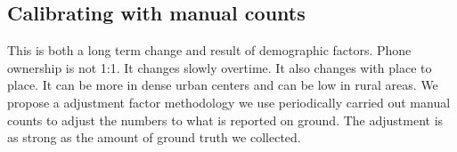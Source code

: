 \subsection{Calibrating with manual counts}
This is both a long term change and result of demographic factors.
Phone ownership is not 1:1. It changes slowly overtime. It also changes
with place to place. It can be more in dense urban centers
and can be low in rural areas. We propose a adjustment factor methodology
we use periodically carried out manual counts to adjust the numbers
to what is reported on ground. The adjustment is as strong as the amount of
ground truth we collected.
